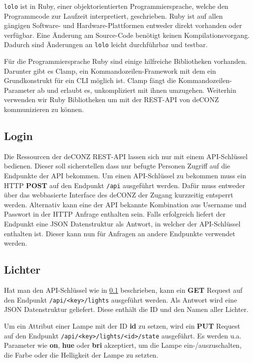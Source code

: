 \documentclass[a4paper,12pt]{article}
\begin{document}
\texttt{lolo} ist in Ruby, einer objektorientierten Programmiersprache, welche den
Programmcode zur Laufzeit interpretiert, geschrieben. Ruby ist auf allen
gängigen Software- und Hardware-Plattformen entweder direkt vorhanden oder
verfügbar. Eine Änderung am Source-Code benötigt keinen Kompilationsvorgang.
Dadurch sind Änderungen an \texttt{lolo} leicht durchführbar und testbar.

Für die Programmiersprache Ruby sind einige hilfreiche Bibliotheken vorhanden.
Darunter gibt es Clamp, ein Kommandozeilen-Framework mit dem ein Grundkonstrukt
für ein CLI möglich ist. Clamp fängt die Kommandozeilen-Parameter ab und
erlaubt es, unkompliziert mit ihnen umzugehen. Weiterhin verwenden wir Ruby
Bibliotheken um mit der REST-API von deCONZ kommunizieren zu können.

\subsection{Login}
\label{api-login}

Die Ressourcen der deCONZ REST-API lassen sich nur mit einem API-Schlüssel
bedienen. Dieser soll sicherstellen dass nur befugte Personen Zugriff auf die
Endpunkte der API bekommen. Um einen API-Schlüssel zu bekommen muss ein HTTP
\textbf{POST} auf den Endpunkt \texttt{/api} ausgeführt werden. Dafür muss
entweder über das webbasierte Interface des deCONZ der Zugang kurzzeitig
entsperrt werden. Alternativ kann eine der API bekannte Kombination aus
Username und Passwort in der HTTP Anfrage enthalten sein. Falls erfolgreich
liefert der Endpunkt eine JSON Datenstruktur als Antwort, in welcher der
API-Schlüssel enthalten ist. Dieser kann nun für Anfragen an andere Endpunkte
verwendet werden.


\subsection{Lichter}
\label{api-lichter}

Hat man den API-Schlüssel wie in \ref{api-login} beschrieben, kann ein
\textbf{GET} Request auf den Endpunkt \texttt{/api/<key>/lights} ausgeführt
werden. Als Antwort wird eine JSON Datenstruktur geliefert. Diese enthält
die ID und den Namen aller Lichter.

Um ein Attribut einer Lampe mit der ID \textbf{id} zu setzen, wird ein
\textbf{PUT} Request auf den Endpunkt
\texttt{/api/<key>/lights/<id>/state} ausgeführt. Es werden u.a. Parameter
wie \textbf{on}, \textbf{hue} oder \textbf{bri} akzeptiert, um die Lampe
ein-/auszuschalten, die Farbe oder die Helligkeit der Lampe zu setzten.
\end{document}

